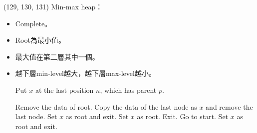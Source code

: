 \item \begin{theorem}{(129, 130, 131)} Min-max heap： \label{min-maxheap}\begin{itemize}
        \item Complete。
        \item Root為最小值。
        \item 最大值在第二層其中一個。
        \item 越下層min-level越大，越下層max-level越小。
        \begin{algorithm}[H]
            \begin{algorithmic}[1]
                    \State Put $x$ at the last position $n$, which has parent $p$.
                            \State {}
                            \State {}
                        \Else
                            \State {}
                        \EndIf
                    \Else {}
                            \State {}
                            \State {}
                        \Else
                            \State {}
                        \EndIf
                    \EndIf
                \EndFunction
            \end{algorithmic}
        \end{algorithm} 
        \begin{algorithm}[H]
            \begin{algorithmic}[1]
                    \State Remove the data of root. Copy the data of the last node as $x$ and remove the last node.
                     
                        \State Set $x$ as root and exit.
                            \State {}
                        \Else
                            \State Set $x$ as root.
                        \EndIf
                        \State Exit.
                            \State {}
                                \State {}
                            \EndIf
                            \State Go to start.
                        \Else
                            \State Set $x$ as root and exit.
                        \EndIf
                    \EndIf
                \EndFunction
            \end{algorithmic}
        \end{algorithm}
    \end{itemize}
\end{theorem}

